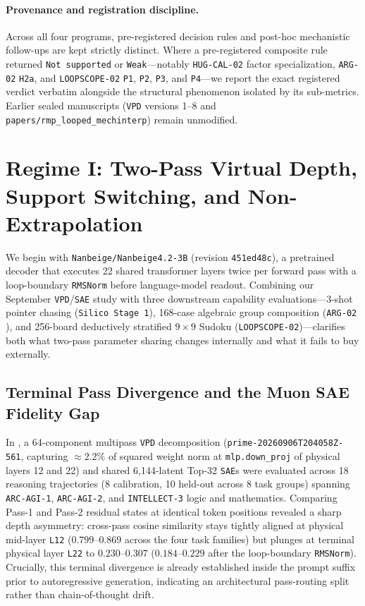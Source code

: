 \documentclass[10pt,letterpaper]{article}
\begin{document}
\paragraph{Provenance and registration discipline.} Across all four programs, pre-registered decision rules and post-hoc mechanistic follow-ups are kept strictly distinct. Where a pre-registered composite rule returned \texttt{Not supported} or \texttt{Weak}—notably \texttt{HUG-CAL-02} factor specialization, \texttt{ARG-02} \texttt{H2a}, and \texttt{LOOPSCOPE-02} \texttt{P1}, \texttt{P2}, \texttt{P3}, and \texttt{P4}—we report the exact registered verdict verbatim alongside the structural phenomenon isolated by its sub-metrics. Earlier sealed manuscripts (\texttt{VPD} versions 1--8 and \texttt{papers/rmp\_looped\_mechinterp}) remain unmodified.

\section{Regime I: Two-Pass Virtual Depth, Support Switching, and Non-Extrapolation}\label{sec:regime1}

We begin with \texttt{Nanbeige/Nanbeige4.2-3B} (revision \texttt{451ed48c}), a pretrained decoder that executes 22 shared transformer layers twice per forward pass with a loop-boundary \texttt{RMSNorm} before language-model readout. Combining our September \texttt{VPD}/\texttt{SAE} study \cite{dugan2026vpd} with three downstream capability evaluations—3-shot pointer chasing (\texttt{Silico Stage 1}), 168-case algebraic group composition (\texttt{ARG-02} \cite{dugan2026arg02}), and 256-board deductively stratified $9\times 9$ Sudoku (\texttt{LOOPSCOPE-02})—clarifies both what two-pass parameter sharing changes internally and what it fails to buy externally.

\subsection{Terminal Pass Divergence and the Muon SAE Fidelity Gap}

In \cite{dugan2026vpd}, a 64-component multipass \texttt{VPD} decomposition (\texttt{prime-20260906T204058Z-561}, capturing $\approx 2.2\%$ of squared weight norm at \texttt{mlp.down\_proj} of physical layers 12 and 22) and shared 6,144-latent Top-32 \texttt{SAE}s were evaluated across 18 reasoning trajectories (8 calibration, 10 held-out across 8 task groups) spanning \texttt{ARC-AGI-1}, \texttt{ARC-AGI-2}, and \texttt{INTELLECT-3} logic and mathematics. Comparing Pass-1 and Pass-2 residual states at identical token positions revealed a sharp depth asymmetry: cross-pass cosine similarity stays tightly aligned at physical mid-layer \texttt{L12} ($0.799$--$0.869$ across the four task families) but plunges at terminal physical layer \texttt{L22} to $0.230$--$0.307$ ($0.184$--$0.229$ after the loop-boundary \texttt{RMSNorm}). Crucially, this terminal divergence is already established inside the prompt suffix prior to autoregressive generation, indicating an architectural pass-routing split rather than chain-of-thought drift.
\end{document}
